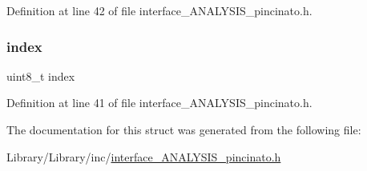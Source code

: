 Definition at line 42 of file interface\+\_\+\+A\+N\+A\+L\+Y\+S\+I\+S\+\_\+pincinato.\+h.

\mbox{\label{struct_data_buffer___aae5a12e607d0f782506d9e6ec6179c64}} 
\subsubsection{\texorpdfstring{index}{index}}
{\footnotesize\ttfamily uint8\+\_\+t index}



Definition at line 41 of file interface\+\_\+\+A\+N\+A\+L\+Y\+S\+I\+S\+\_\+pincinato.\+h.



The documentation for this struct was generated from the following file\+:\begin{DoxyCompactItemize}
\item 
Library/\+Library/inc/\mbox{\hyperlink{interface___a_n_a_l_y_s_i_s__pincinato_8h}{interface\+\_\+\+A\+N\+A\+L\+Y\+S\+I\+S\+\_\+pincinato.\+h}}\end{DoxyCompactItemize}
